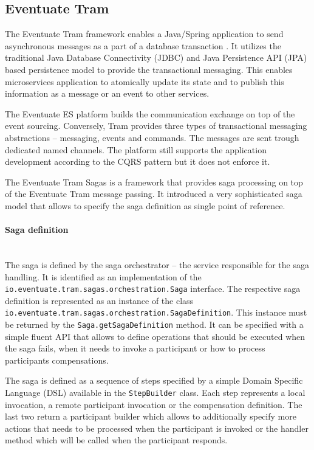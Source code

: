 \documentclass[oneside,
  digital, %
  table,   %
  nolof,     %
  nolot,     %
]{fithesis3}
\newcommand{\newlinepar}[1]{\paragraph{#1}\needspace{4\baselineskip}\mbox{}\\}
\begin{document}
\subsection{Eventuate Tram}
\label{sec:eventuate-tram}

The Eventuate Tram framework enables a Java/Spring application to send asynchronous messages as a part of a database transaction \cite{eventuate-tram}. It utilizes the traditional Java Database Connectivity (JDBC) and Java Persistence API (JPA) based persistence model to provide the transactional messaging. This enables microservices application to atomically update its state and to publish this information as a message or an event to other services.

The Eventuate ES platform builds the communication exchange on top of the event sourcing. Conversely, Tram provides three types of transactional messaging abstractions -- messaging, events and commands. The messages are sent trough dedicated named channels. The platform still supports the application development according to the CQRS pattern but it does not enforce it.

The Eventuate Tram Sagas is a framework that provides saga processing on top of the Eventuate Tram message passing. It introduced a very sophisticated saga model that allows to specify the saga definition as single point of reference. 

\newlinepar{Saga definition}

The saga is defined by the saga orchestrator -- the service responsible for the saga handling. It is identified as an implementation of the \texttt{io.eventuate.tram.sagas.orchestration.Saga} interface. The respective saga definition is represented as an instance of the class \texttt{io.eventuate.tram.sagas.orchestration.SagaDefinition}. This instance must be returned by the \texttt{Saga.getSagaDefinition} method. It can be specified with a simple fluent API that allows to define operations that should be executed when the saga fails, when it needs to invoke a participant or how to process participants compensations. 

The saga is defined as a sequence of steps specified by a simple Domain Specific Language (DSL) available in the \texttt{StepBuilder} class. Each step represents a local invocation, a remote participant invocation or the compensation definition. The last two return a participant builder which allows to additionally specify more actions that needs to be processed when the participant is invoked or the handler method which will be called when the participant responds.
\end{document}
